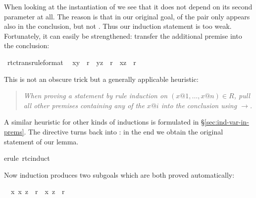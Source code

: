 \begin{isabellebody}
\begin{isamarkuptxt}
When looking at the instantiation of  we see that it does not
depend on its second parameter at all. The reason is that in our original
goal, of the pair  only  appears also in the
conclusion, but not . Thus our induction statement is too
weak. Fortunately, it can easily be strengthened:
transfer the additional premise  into the conclusion:%
\end{isamarkuptxt}%
\isamarkuptrue%
\isamarkupfalse%
%
\endisatagproof
{\isafoldproof}%
%
\isadelimproof
%
\endisadelimproof
{}\isamarkupfalse%
\ rtc{\isacharunderscore}trans{\isacharbrackleft}rule{\isacharunderscore}format{\isacharbrackright}{\isacharcolon}\isanewline
\ \ {\isachardoublequoteopen}{\isacharparenleft}x{\isacharcomma}y{\isacharparenright}\ {\isasymin}\ r{\isacharasterisk}\ {\isasymLongrightarrow}\ {\isacharparenleft}y{\isacharcomma}z{\isacharparenright}\ {\isasymin}\ r{\isacharasterisk}\ {\isasymlongrightarrow}\ {\isacharparenleft}x{\isacharcomma}z{\isacharparenright}\ {\isasymin}\ r{\isacharasterisk}{\isachardoublequoteclose}%
\isadelimproof
%
\endisadelimproof
%
\isatagproof
%
\begin{isamarkuptxt}%
\noindent
This is not an obscure trick but a generally applicable heuristic:
\begin{quote}\em
When proving a statement by rule induction on $(x@1,\dots,x@n) \in R$,
pull all other premises containing any of the $x@i$ into the conclusion
using $\longrightarrow$.
\end{quote}
A similar heuristic for other kinds of inductions is formulated in
\S\ref{sec:ind-var-in-prems}. The  directive turns
\isa{{\isasymlongrightarrow}} back into \isa{{\isasymLongrightarrow}}: in the end we obtain the original
statement of our lemma.%
\end{isamarkuptxt}%
\isamarkuptrue%
\isamarkupfalse%
{\isacharparenleft}erule\ rtc{\isachardot}induct{\isacharparenright}%
\begin{isamarkuptxt}%
\noindent
Now induction produces two subgoals which are both proved automatically:
\begin{isabelle}%
\ {}{\isachardot}\ {\isasymAnd}x{\isachardot}\ {\isacharparenleft}x{\isacharcomma}\ z{\isacharparenright}\ {\isasymin}\ r{\isacharasterisk}\ {\isasymlongrightarrow}\ {\isacharparenleft}x{\isacharcomma}\ z{\isacharparenright}\ {\isasymin}\ r{\isacharasterisk}\isanewline

\end{isabelle}
\end{isamarkuptxt}
\end{isabellebody}
